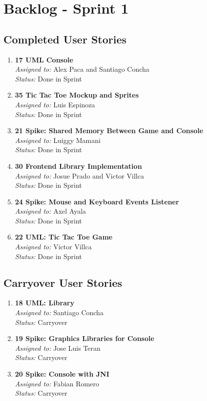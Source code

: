 \section{Backlog - Sprint 1}

\subsection*{Completed User Stories}

\begin{enumerate}
    \item \textbf{17 UML Console} \\
    \textit{Assigned to:} Alex Paca and Santiago Concha \\
    \textit{Status:} Done in Sprint
    \item \textbf{35 Tic Tac Toe Mockup and Sprites} \\
    \textit{Assigned to:} Luis Espinoza \\
    \textit{Status:} Done in Sprint
    \item \textbf{21 Spike: Shared Memory Between Game and Console} \\
    \textit{Assigned to:} Luiggy Mamani \\
    \textit{Status:} Done in Sprint
    \item \textbf{30 Frontend Library Implementation} \\
    \textit{Assigned to:} Josue Prado and Victor Villca\\
    \textit{Status:} Done in Sprint
    \item \textbf{24 Spike: Mouse and Keyboard Events Listener} \\
    \textit{Assigned to:} Axel Ayala \\
    \textit{Status:} Done in Sprint
    \item \textbf{22 UML: Tic Tac Toe Game} \\
    \textit{Assigned to:} Victor Villca\\
    \textit{Status:} Done in Sprint
\end{enumerate}

\subsection*{Carryover User Stories}

\begin{enumerate}
    \item \textbf{18 UML: Library} \\
    \textit{Assigned to:} Santiago Concha \\
    \textit{Status:} Carryover 
    \item \textbf{19 Spike: Graphics Libraries for Console} \\
    \textit{Assigned to:} Jose Luis Teran\\
    \textit{Status:} Carryover
    \item \textbf{20 Spike: Console with JNI} \\
    \textit{Assigned to:} Fabian Romero\\
    \textit{Status:} Carryover
\end{enumerate}


